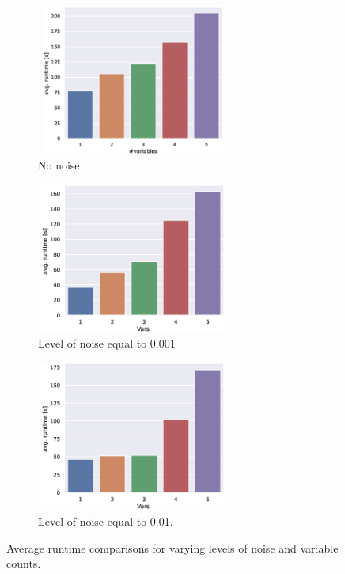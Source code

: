 \documentclass{bmcart}
\begin{document}
\begin{figure}[!h]
	\begin{subfigure}[b]{0.45\textwidth}
		\includegraphics[width=180pt,height=140pt]{plots/numsize_vs_time_no_noise.eps}
		\caption{No noise}
		\label{fig:time-no-noise}
	\end{subfigure}
	\hfill
	\begin{subfigure}[b]{0.45\textwidth}
		
		\includegraphics[width=180pt,height=140pt]{plots/vars_vs_time_noise0_001.eps}
		\caption{Level of noise equal to 0.001}
		\label{fig:time-noise0.001}
	\end{subfigure}
	\centering
	\begin{subfigure}[b]{0.40\textwidth}
		\includegraphics[width=180pt,height=140pt]{plots/vars_vs_time_noise0_01.eps}
		\caption{Level of noise equal to 0.01.}
		\label{fig:time-noise0.01}
	\end{subfigure}
	\caption{Average runtime comparisons for varying levels of noise and variable counts.}
	\label{fig:runtime_rils_rols}
\end{figure}
\end{document}
